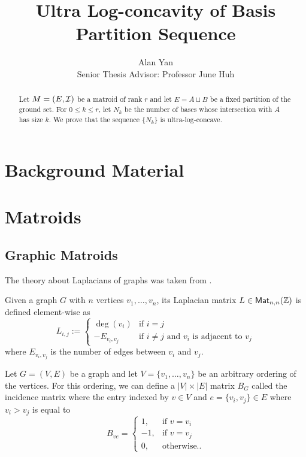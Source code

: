 \documentclass[12pt]{article}
\title{Ultra Log-concavity of Basis Partition Sequence}
\author{Alan Yan \\ Senior Thesis Advisor: Professor June Huh}
\begin{document}
\maketitle

\begin{abstract}
	Let $M = (E, \mathcal{I})$ be a matroid of rank $r$ and let $E = A \sqcup B$ be a fixed partition of the ground set. For $0 \leq k \leq r$, let $N_k$ be the number of bases whose intersection with $A$ has size $k$. We prove that the sequence $\{N_k\}$ is ultra-log-concave. 
\end{abstract}
\tableofcontents

\newpage 

\section{Background Material}

\section{Matroids}



\subsection{Graphic Matroids}

The theory about Laplacians of graphs was taken from \cite{chung-spectral-graph-theory}.
\begin{defn}
	Given a graph $G$ with $n$ vertices $v_1, \ldots, v_n$, its Laplacian matrix $L \in \mathsf{Mat}_{n, n} (\mathbb{Z})$ is defined element-wise as 
	\[
		L_{i, j} := \begin{cases}
			\deg (v_i) & \text{if $i = j$} \\
			- E_{v_i, v_j} & \text{if $i \neq j$ and $v_i$ is adjacent to $v_j$}
		\end{cases}
	\]
	where $E_{v_i, v_j}$ is the number of edges between $v_i$ and $v_j$.
\end{defn}
	
\begin{defn}
	Let $G = (V, E)$ be a graph and let $V = \{v_1, \ldots, v_n\}$ be an arbitrary ordering of the vertices. For this ordering, we can define a $|V| \times |E|$ matrix $B_{G}$ called the incidence matrix where the entry indexed by $v \in V$ and $e = \{v_i, v_j\} \in E$ where $v_i > v_j$ is equal to 
	\[
		B_{ve} = \begin{cases}
			1, & \text{if $v = v_i$} \\
			-1, & \text{if $v = v_j$} \\
			0, & \text{otherwise.}.
		\end{cases}
	\]
\end{defn}
\end{document}
